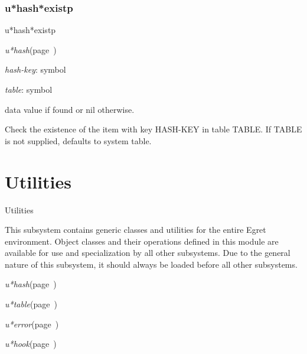 \subsection{u*hash*existp}
\label{u*hash*existp}

\begin{description}
\item [Name:]  u*hash*existp

\item [Class:]
{\sl u*hash}\hfill(page~\pageref{u*hash})

\item [Parameters:]
\item {\sl hash-key}:  symbol

\item {\sl table}:  symbol


\item [Return-value:] 
data value if found or nil otherwise.

\item [Description:]
Check the existence of the item with key HASH-KEY in
table TABLE. If TABLE is not supplied, defaults
to system table.

\item [Public:]




\end{description}
\horizontalline
\chapter{Utilities}
\label{Utilities}

\begin{description}
\item [Name:]  Utilities

\item [Description:]
This subsystem contains generic classes and utilities for the
entire Egret environment.  Object classes and their operations
defined in this module are available for use and
specialization by all other subsystems. Due to the general
nature of this subsystem, it should always be loaded before
all other subsystems.

\item [Public-classes:]
\item {\sl u*hash}\hfill(page~\pageref{u*hash})
\item {\sl u*table}\hfill(page~\pageref{u*table})
\item {\sl u*error}\hfill(page~\pageref{u*error})
\item {\sl u*hook}\hfill(page~\pageref{u*hook})




\end{description}
\horizontalline

